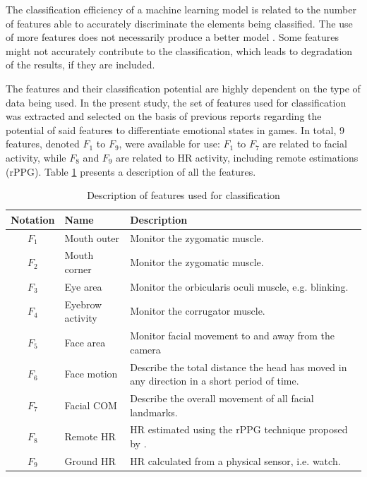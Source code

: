The classification efficiency of a machine learning model is related to the number of features able to accurately discriminate the elements being classified. The use of more features does not necessarily produce a better model \parencite[Chapter 6]{james2013introduction}. Some features might not accurately contribute to the classification, which leads to degradation of the results, if they are included.

The features and their classification potential are highly dependent on the type of data being used. In the present study, the set of features used for classification was extracted and selected on the basis of previous reports regarding the potential of said features to differentiate emotional states in games. In total, 9 features, denoted $F_1$ to $F_9$, were available for use: $F_1$ to $F_7$ are related to facial activity, while $F_8$ and $F_9$ are related to HR activity, including remote estimations (rPPG). Table \ref{table:study5-features-list} presents a description of all the features.

\begin{table}[h]
    \centering
    \caption{Description of features used for classification}
    \label{table:study5-features-list}
    \begin{tabular}[l]{@{}clp{6.5cm}}
        \toprule%
            \textbf{Notation} & \textbf{Name} & \textbf{Description} \\
        \midrule%
            $F_1$ & Mouth outer & Monitor the zygomatic muscle.  \\
            $F_2$ & Mouth corner & Monitor the zygomatic muscle. \\
            $F_3$ & Eye area & Monitor the orbicularis oculi muscle, e.g. blinking. \\
            $F_4$ & Eyebrow activity & Monitor the corrugator muscle.  \\
            $F_5$ & Face area & Monitor facial movement to and away from the camera  \\
            $F_6$ & Face motion & Describe the total distance the head has moved in any direction in a short period of time.  \\
            $F_7$ & Facial COM & Describe the overall movement of all facial landmarks. \\
            $F_8$ & Remote HR & HR estimated using the rPPG technique proposed by \textcite{poh2011advancements}.  \\
            $F_9$ & Ground HR & HR calculated from a physical sensor, i.e. watch. \\
        \bottomrule%
    \end{tabular}
\end{table}

